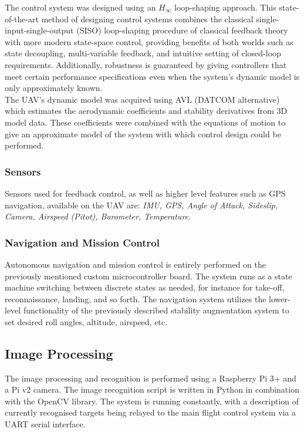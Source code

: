 The control system was designed using an $H_{\infty}$ loop-shaping approach. This state-of-the-art method of designing control systems combines the classical single-input-single-output (SISO) loop-shaping procedure of classical feedback theory with more modern state-space control, providing benefits of both worlds such as state decoupling, multi-variable feedback, and intuitive setting of closed-loop requirements. Additionally, robustness is guaranteed by giving controllers that meet certain performance specifications even when the system's dynamic model is only approximately known. \\

The UAV's dynamic model was acquired using AVL (DATCOM alternative) which estimates the aerodynamic coefficients and stability derivatives from 3D model data. These coefficients were combined with the equations of motion to give an approximate model of the system with which control design could be performed. \\

\subsubsection{Sensors}
Sensors used for feedback control, as well as higher level features such as GPS navigation, available on the UAV are: \textit{IMU, GPS, Angle of Attack, Sideslip, Camera, Airspeed (Pitot), Barometer, Temperature}.

\subsubsection{Navigation and Mission Control}
Autonomous navigation and mission control is entirely performed on the previously mentioned custom microcontroller board. The system runs as a state machine switching between discrete states as needed, for instance for take-off, reconnaissance, landing, and so forth. The navigation system utilizes the lower-level functionality of the previously described stability augmentation system to set desired roll angles, altitude, airspeed, etc.

\subsection{Image Processing}
The image processing and recognition is performed using a Raspberry Pi 3+ and a Pi v2 camera. The image recognition script is written in Python in combination with the OpenCV library. The system is running constantly, with a description of currently recognised targets being relayed to the main flight control system via a UART serial interface.


